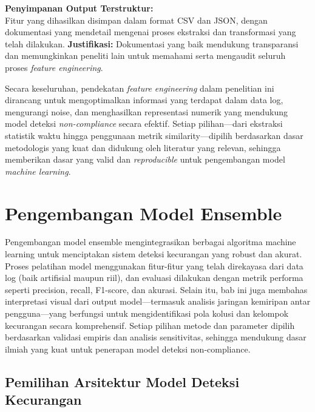 \textbf{Penyimpanan Output Terstruktur:} \\
Fitur yang dihasilkan disimpan dalam format CSV dan JSON, dengan dokumentasi yang mendetail mengenai proses ekstraksi dan transformasi yang telah dilakukan.
\textbf{Justifikasi:} Dokumentasi yang baik mendukung transparansi dan memungkinkan peneliti lain untuk memahami serta mengaudit seluruh proses \textit{feature engineering}.

Secara keseluruhan, pendekatan \textit{feature engineering} dalam penelitian ini dirancang untuk mengoptimalkan informasi yang terdapat dalam data log, mengurangi noise, dan menghasilkan representasi numerik yang mendukung model deteksi \textit{non-compliance} secara efektif. Setiap pilihan—dari ekstraksi statistik waktu hingga penggunaan metrik similarity—dipilih berdasarkan dasar metodologis yang kuat dan didukung oleh literatur yang relevan, sehingga memberikan dasar yang valid dan \textit{reproducible} untuk pengembangan model \textit{machine learning}.


\section{Pengembangan Model Ensemble}
\label{sec:modelDeteksiKecurangan}

Pengembangan model ensemble mengintegrasikan berbagai algoritma machine learning untuk menciptakan sistem deteksi kecurangan yang robust dan akurat. Proses pelatihan model menggunakan fitur-fitur yang telah direkayasa dari data log (baik artifisial maupun riil), dan evaluasi dilakukan dengan metrik performa seperti precision, recall, F1-score, dan akurasi. Selain itu, bab ini juga membahas interpretasi visual dari output model—termasuk analisis jaringan kemiripan antar pengguna—yang berfungsi untuk mengidentifikasi pola kolusi dan kelompok kecurangan secara komprehensif. Setiap pilihan metode dan parameter dipilih berdasarkan validasi empiris dan analisis sensitivitas, sehingga mendukung dasar ilmiah yang kuat untuk penerapan model deteksi non-compliance.

\subsection{Pemilihan Arsitektur Model Deteksi Kecurangan}
\label{subsec:pemilihanArsitekturModel}

